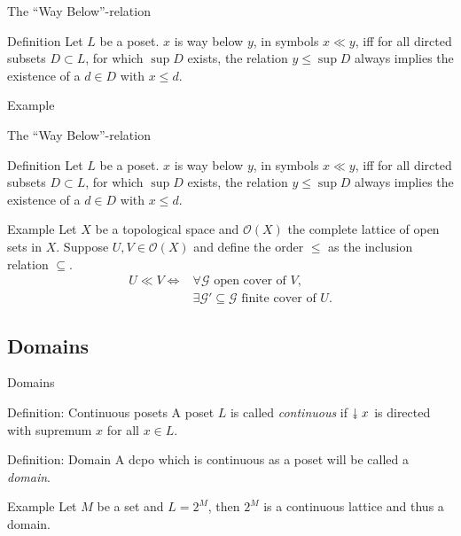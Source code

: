 \documentclass{beamer}
\newcommand{\downdownarrow}{\mathrel{\reflectbox{\rotatebox[origin=c]{90}{$\twoheadleftarrow$}}}}
\begin{document}
\begin{frame}{The ``Way Below''-relation}
\begin{block}{Definition}
Let $L$ be a poset. $x$ is way below $y$, in symbols $x \ll y$, iff for all dircted subsets $D \subset L$, for which $\sup D$ exists, the relation $y \leq \sup D$ always implies the existence of a $d \in D$ with $x \leq d$.
\end{block}

\begin{block}{Example}

\end{block}


\end{frame}


\begin{frame}{The ``Way Below''-relation}


\begin{block}{Definition}
Let $L$ be a poset. $x$ is way below $y$, in symbols $x \ll y$, iff for all dircted subsets $D \subset L$, for which $\sup D$ exists, the relation $y \leq \sup D$ always implies the existence of a $d \in D$ with $x \leq d$.
\end{block}
\begin{block}{Example}
Let $X$ be a topological space and $\mathcal{O}(X)$ the complete lattice of open sets in $X$. Suppose $U, V \in \mathcal{O}(X)$ and define the order $\leq$ as the inclusion relation $\subseteq$.
\begin{align*}
 U \ll V \Leftrightarrow &\forall \mathcal{G} \text{ open cover of } V,\\
 &\exists \mathcal{G}' \subseteq \mathcal{G} \text{ finite cover of } U.
\end{align*}
\end{block}
\end{frame}

\subsection{Domains}
\begin{frame}{Domains}
\begin{block}{Definition: Continuous posets}
A poset $L$ is called \emph{continuous} if $\downdownarrow x$ is directed with supremum $x$ for all $x \in L$.
\end{block}

\begin{block}{Definition: Domain}
A dcpo which is continuous as a poset will be called a \emph{domain}.
\end{block}

\begin{block}{Example}
Let $M$ be a set and $L = 2^M$, then $2^M$ is a continuous lattice and thus a domain.
\end{block}
\end{frame}
\end{document}
